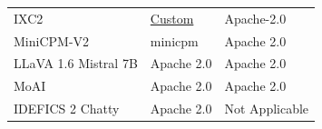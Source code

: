 \begin{table}[h]
\begin{tabular}{lll}
IXC2                 & \href{https://huggingface.co/internlm/internlm-xcomposer2-vl-7b}{Custom}                 & Apache-2.0            \\
MiniCPM-V2           & minicpm                & Apache 2.0            \\
LLaVA 1.6 Mistral 7B & Apache 2.0             & Apache 2.0            \\
MoAI                 & Apache 2.0             & Apache 2.0            \\
IDEFICS 2 Chatty     & Apache 2.0             & Not Applicable       \\
\bottomrule
\hline
\end{tabular}
\label{tab:model_license}
\end{table}

\newpage
